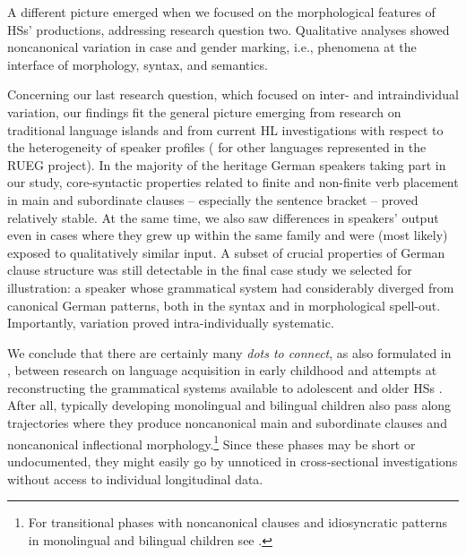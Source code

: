 \documentclass[output=paper]{langscibook}
\begin{document}
\begin{sloppypar}
A different picture emerged when we focused on the morphological features of HSs’ productions, addressing research question two. Qualitative analyses showed noncanonical variation in case and gender marking, i.e., phenomena at the interface of morphology, syntax, and semantics.
\end{sloppypar}

Concerning our last research question, which focused on inter- and intraindividual variation, our findings fit the general picture emerging from research on traditional language islands and from current HL investigations with respect to the heterogeneity of speaker profiles (\citealt{AalberseEtAl2019, MontrulPolinsky2021, Polinsky2018Bilingual, Polinsky2018Heritage, WieseEtAl2022} for other languages represented in the RUEG project). In the majority of the heritage German speakers taking part in our study, core-syntactic properties related to finite and non-finite verb placement in main and subordinate clauses – especially the sentence bracket – proved relatively stable. At the same time, we also saw differences in speakers’ output even in cases where they grew up within the same family and were (most likely) exposed to qualitatively similar input. A subset of crucial properties of German clause structure was still detectable in the final case study we selected for illustration: a speaker whose grammatical system had considerably diverged from canonical German patterns, both in the syntax and in morphological spell-out. Importantly, variation proved intra-individually systematic.

We conclude that there are certainly many \textit{dots to connect}, as also formulated in \citet{Montrul2018}, between research on language acquisition in early childhood and attempts at reconstructing the grammatical systems available to adolescent and older HSs \citep{Polinsky2018Bilingual}. After all, typically developing monolingual and bilingual children also pass along trajectories where they produce noncanonical main and subordinate clauses and noncanonical inflectional morphology.\footnote{For transitional phases with noncanonical clauses and idiosyncratic patterns in monolingual and bilingual children see \citealt{Döpke2000, FritzenschaftEtAl1990, GawlitzekMaiwald1994, Müller1998, Rothweiler1993, Tracy2011}.}  Since these phases may be short or undocumented, they might easily go by unnoticed in cross-sectional investigations without access to individual longitudinal data.
\end{document}
